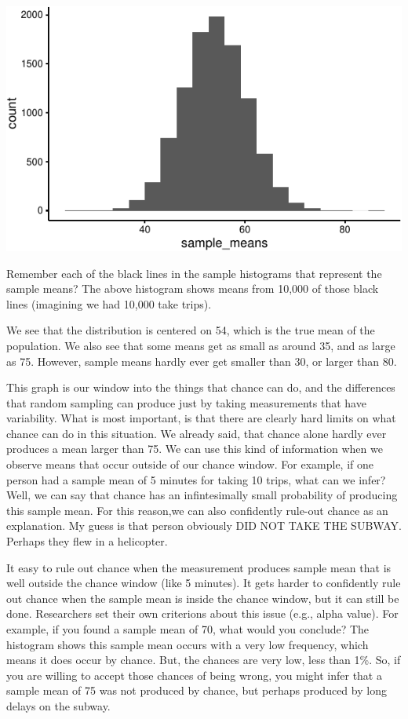 \includegraphics{Ttest_files/figure-latex/unnamed-chunk-4-1}

Remember each of the black lines in the sample histograms that represent
the sample means? The above histogram shows means from 10,000 of those
black lines (imagining we had 10,000 take trips).

We see that the distribution is centered on 54, which is the true mean
of the population. We also see that some means get as small as around
35, and as large as 75. However, sample means hardly ever get smaller
than 30, or larger than 80.

This graph is our window into the things that chance can do, and the
differences that random sampling can produce just by taking measurements
that have variability. What is most important, is that there are clearly
hard limits on what chance can do in this situation. We already said,
that chance alone hardly ever produces a mean larger than 75. We can use
this kind of information when we observe means that occur outside of our
chance window. For example, if one person had a sample mean of 5 minutes
for taking 10 trips, what can we infer? Well, we can say that chance has
an infintesimally small probability of producing this sample mean. For
this reason,we can also confidently rule-out chance as an explanation.
My guess is that person obviously DID NOT TAKE THE SUBWAY. Perhaps they
flew in a helicopter.

It easy to rule out chance when the measurement produces sample mean
that is well outside the chance window (like 5 minutes). It gets harder
to confidently rule out chance when the sample mean is inside the chance
window, but it can still be done. Researchers set their own criterions
about this issue (e.g., alpha value). For example, if you found a sample
mean of 70, what would you conclude? The histogram shows this sample
mean occurs with a very low frequency, which means it does occur by
chance. But, the chances are very low, less than 1\%. So, if you are
willing to accept those chances of being wrong, you might infer that a
sample mean of 75 was not produced by chance, but perhaps produced by
long delays on the subway.

